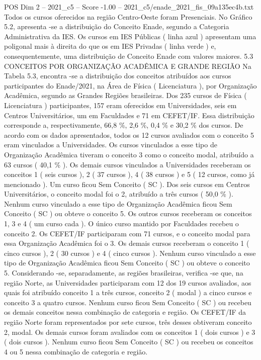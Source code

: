 \begin{textsample}{POS Dim 2 – 2021\_c5 – Score -1.00 – 2021\_c5/enade\_2021\_fis\_09a135ec4b.txt}
Todos os cursos oferecidos na região Centro-Oeste foram Presenciais.
No Gráfico 5.2, apresenta -se a distribuição do Conceito Enade, segundo a Categoria Administrativa da IES.
Os cursos em IES Públicas ( linha azul ) apresentam uma poligonal mais à direita do que os em IES Privadas ( linha verde ) e, consequentemente, uma distribuição de Conceito Enade com valores maiores. 5.3 CONCEITOS POR ORGANIZAÇÃO ACADÊMICA E GRANDE REGIÃO Na Tabela 5.3, encontra -se a distribuição dos conceitos atribuídos aos cursos participantes do Enade/2021, na Área de Física ( Licenciatura ), por Organização Acadêmica, segundo as Grandes Regiões brasileiras.
Dos 235 cursos de Física ( Licenciatura ) participantes, 157 eram oferecidos em Universidades, seis em Centros Universitários, um em Faculdades e 71 em CEFET/IF.
Essa distribuição corresponde a, respectivamente, 66,8 \%, 2,6 \%, 0,4 \% e 30,2 \% dos cursos.
De acordo com os dados apresentados, todos os 12 cursos avaliados com o conceito 5 eram vinculados a Universidades.
Os cursos vinculados a esse tipo de Organização Acadêmica tiveram o conceito 3 como o conceito modal, atribuído a 63 cursos ( 40,1 \% ).
Os demais cursos vinculados a Universidades receberam os conceitos 1 ( seis cursos ), 2 ( 37 cursos ), 4 ( 38 cursos ) e 5 ( 12 cursos, como já mencionado ).
Um curso ficou Sem Conceito ( SC ).
Dos seis cursos em Centros Universitários, o conceito modal foi o 2, atribuído a três cursos ( 50,0 \% ).
Nenhum curso vinculado a esse tipo de Organização Acadêmica ficou Sem Conceito ( SC ) ou obteve o conceito 5.
Os outros cursos receberam os conceitos 1, 3 e 4 ( um curso cada ).
O único curso mantido por Faculdades recebeu o conceito 2.
Os CEFET/IF participaram com 71 cursos, e o conceito modal para essa Organização Acadêmica foi o 3.
Os demais cursos receberam o conceito 1 ( cinco cursos ), 2 ( 30 cursos ) e 4 ( cinco cursos ).
Nenhum curso vinculado a esse tipo de Organização Acadêmica ficou Sem Conceito ( SC ) ou obteve o conceito 5.
Considerando -se, separadamente, as regiões brasileiras, verifica -se que, na região Norte, as Universidades participaram com 12 dos 19 cursos avaliados, aos quais foi atribuído conceito 1 a três cursos, conceito 2 ( modal ) a cinco cursos e conceito 3 a quatro cursos.
Nenhum curso ficou Sem Conceito ( SC ) ou recebeu os demais conceitos nessa combinação de categoria e região.
Os CEFET/IF da região Norte foram representados por sete cursos, três desses obtiveram conceito 2, modal.
Os demais cursos foram avaliados com os conceitos 1 ( dois cursos ) e 3 ( dois cursos ).
Nenhum curso ficou Sem Conceito ( SC ) ou recebeu os conceitos 4 ou 5 nessa combinação de categoria e região.

\end{textsample}
